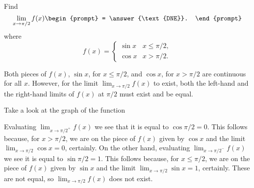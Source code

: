 \documentclass{ximera}
\author{Gregory Hartman \and Matthew Carr}
\begin{document}
\begin{exercise}



  Find 
  \[
  \lim_{x\to \pi/2} f(x)
  \begin{prompt}
  = \answer{\text{DNE}}.
  \end{prompt}
  \]
  where
  \[
  f(x) = \left\{\begin{array}{cl} \sin x & x\leq \pi/2, \\ \cos x & x>\pi/2. \end{array}\right.
  \]
    \begin{hint}
     Both pieces of $f(x)$, $\sin x$, for $x\leq\pi/2$, and $\cos x$, for $x>\pi/2$ are continuous for all $x$. However, for the limit $\lim_{x\to\pi/2}f(x)$ to exist, both the left-hand and the right-hand limits of $f(x)$ at $\pi/2$ must exist and be equal.
    \end{hint}
     \begin{hint}
    	Take a look at the graph of the function
    \begin{center}
      \end{center} 
    \end{hint}
    \begin{hint}
     Evaluating $\lim_{x\to{\pi/2}^{+}}f(x)$ we see that it is equal to $\cos \pi/2=0$. This follows because, for $x>\pi/2$, we are on the piece of $f(x)$ given by $\cos x$ and the limit $\lim_{x\to{\pi/2}}\cos x=0$, certainly. On the other hand, evaluating $\lim_{x\to{\pi/2}^{-}}f(x)$ we see it is equal to $\sin \pi/2=1$. This follows because, for $x\leq\pi/2$, we are on the piece of $f(x)$ given by $\sin x$ and the limit $\lim_{x\to\pi/2}\sin x=1$, certainly. These are not equal, so $\lim_{x\to\pi/2}f(x)$ does not exist.
    \end{hint}
\end{exercise}
\end{document}
